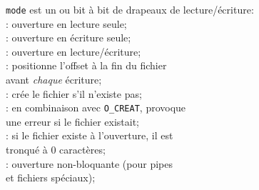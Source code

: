 \begin{frame}
\newpage
{\tt mode} est un ou bit \`a bit de drapeaux de lecture/\'ecriture: \\ 
\hspace*{5mm}{\tt O\_RDONLY}: ouverture en lecture seule; \\
\hspace*{5mm}{\tt O\_WRONLY}: ouverture en \'ecriture seule; \\
\hspace*{5mm}{\tt O\_RDWR}: ouverture en lecture/\'ecriture; \\
\hspace*{5mm}{\tt O\_APPEND}: positionne l'offset \`a la fin du fichier \\ 
\hspace*{7mm}avant {\em chaque} \'ecriture; \\
\hspace*{5mm}{\tt O\_CREAT}: cr\'ee le fichier s'il n'existe pas; \\
\hspace*{5mm}{\tt O\_EXCL}: en combinaison avec {\tt O\_CREAT}, provoque \\
\hspace*{7mm}une erreur si le fichier existait; \\
\hspace*{5mm}{\tt O\_TRUNC}: si le fichier existe \`a l'ouverture, il est \\
\hspace*{7mm}tronqu\'e \`a 0 caract\`eres; \\
\hspace*{5mm}{\tt O\_NONBLOCK}: ouverture non-bloquante (pour pipes \\
\hspace*{7mm}et fichiers sp\'eciaux);  \\


\end{frame}

